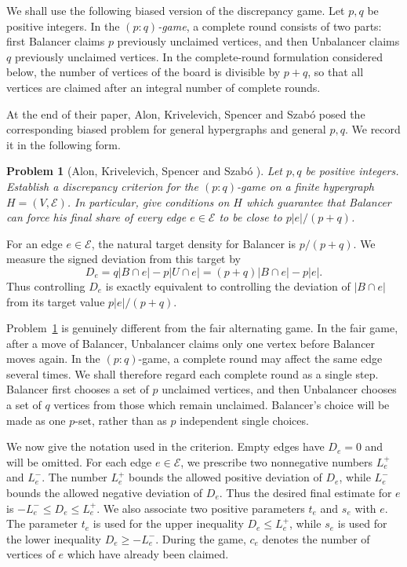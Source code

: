 \documentclass[twoside,12pt]{article}
\numberwithin{equation}{section}
\newtheorem{problem}[theorem]{Problem}
\begin{document}
We shall use the following biased version of the discrepancy game.  Let $p,q$ be positive integers.  In the \textit{$(p:q)$-game}, a complete round consists of two parts: first Balancer claims $p$ previously unclaimed vertices, and then Unbalancer claims $q$ previously unclaimed vertices.  In the complete-round formulation considered below, the number of vertices of the board is divisible by $p+q$, so that all vertices are claimed after an integral number of complete rounds.

At the end of their paper, Alon, Krivelevich, Spencer and Szab\'o \cite{AKSS} posed the corresponding biased problem for general hypergraphs and general $p,q$. We record it in the following form.

\begin{problem}[Alon,
Krivelevich, Spencer and Szab\'o  \cite{AKSS}]\label{prob:AKSS-biased}
Let $p,q$ be positive integers.  Establish a discrepancy criterion for the $(p:q)$-game on a finite hypergraph $H=(V,\mathcal E)$.  In particular, give conditions on $H$ which guarantee that Balancer can force his final share of every edge $e\in\mathcal E$ to be close to $p|e|/(p+q)$.
\end{problem}

For an edge $e\in\mathcal E$, the natural target density for Balancer is $p/(p+q)$.  We measure the signed deviation from this target by
\begin{equation}
\label{eq:D}
        D_e=q|B\cap e|-p|U\cap e|
        =(p+q)|B\cap e|-p|e|.
\end{equation}
Thus controlling $D_e$ is exactly equivalent to controlling the deviation of $|B\cap e|$ from its target value $p|e|/(p+q)$.

Problem~\ref{prob:AKSS-biased} is genuinely different from the fair alternating game.  In the fair game, after a move of Balancer, Unbalancer claims only one vertex before Balancer moves again. In the $(p:q)$-game, a complete round may affect the same edge several times. 
We shall therefore regard each complete round as a single step.  Balancer first chooses a set of $p$ unclaimed vertices, and then Unbalancer chooses a set of $q$ vertices from those which remain unclaimed. Balancer's choice will be made as one $p$-set, rather than as $p$ independent single choices.

We now give the notation used in the criterion. Empty edges have $D_e=0$ and will be omitted.  For each edge $e\in\mathcal E$, we prescribe two nonnegative numbers $L_e^+$ and $L_e^-$. The number $L_e^+$ bounds the allowed positive deviation of $D_e$, while $L_e^-$ bounds the allowed negative deviation of $D_e$.  Thus the desired final estimate for $e$ is
$-L_e^-\le D_e\le L_e^+$.
We also associate two positive parameters $t_e$ and $s_e$ with $e$. The parameter $t_e$ is used for the upper inequality $D_e\le L_e^+$, while $s_e$ is used for the lower inequality $D_e\ge -L_e^-$. During the game, $c_e$ denotes the number of vertices of $e$ which have already been claimed.
\end{document}
